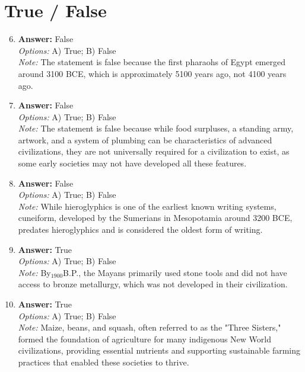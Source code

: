 \documentclass[12pt]{article}
\begin{document}
\section*{True / False}
\begin{enumerate}[label=\arabic*.]
\setcounter{enumi}{5}
\item \textbf{Answer:} False
\\ \textit{Options:} A) True; B) False
\\ \textit{Note:} The statement is false because the first pharaohs of Egypt emerged around 3100 BCE, which is approximately 5100 years ago, not 4100 years ago.
\item \textbf{Answer:} False
\\ \textit{Options:} A) True; B) False
\\ \textit{Note:} The statement is false because while food surpluses, a standing army, artwork, and a system of plumbing can be characteristics of advanced civilizations, they are not universally required for a civilization to exist, as some early societies may not have developed all these features.
\item \textbf{Answer:} False
\\ \textit{Options:} A) True; B) False
\\ \textit{Note:} While hieroglyphics is one of the earliest known writing systems, cuneiform, developed by the Sumerians in Mesopotamia around 3200 BCE, predates hieroglyphics and is considered the oldest form of writing.
\item \textbf{Answer:} True
\\ \textit{Options:} A) True; B) False
\\ \textit{Note:} By$_{1900}$B.P., the Mayans primarily used stone tools and did not have access to bronze metallurgy, which was not developed in their civilization.
\item \textbf{Answer:} True
\\ \textit{Options:} A) True; B) False
\\ \textit{Note:} Maize, beans, and squash, often referred to as the "Three Sisters," formed the foundation of agriculture for many indigenous New World civilizations, providing essential nutrients and supporting sustainable farming practices that enabled these societies to thrive.
\end{enumerate}
\end{document}
